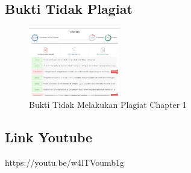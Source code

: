 \subsection{Bukti Tidak Plagiat}
\begin{figure}[H]
	\includegraphics[width=4cm]{figures/1174083/figures1/plagiat.jpg}
	\centering
	\caption{Bukti Tidak Melakukan Plagiat Chapter 1}
\end{figure}

\subsection{Link Youtube}
https://youtu.be/w4lTVoumb1g
